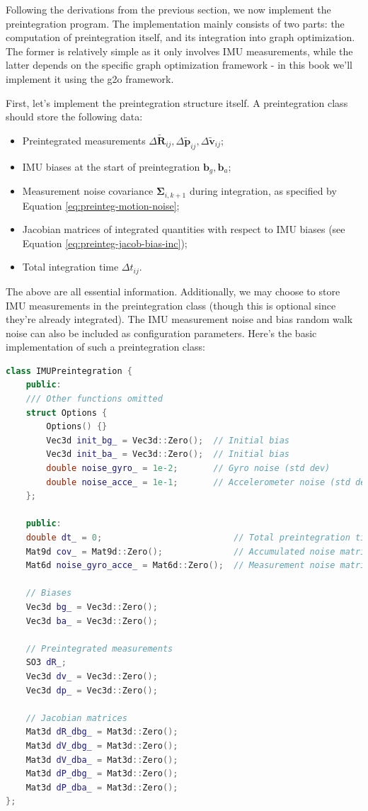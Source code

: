 Following the derivations from the previous section, we now implement the preintegration program. The implementation mainly consists of two parts: the computation of preintegration itself, and its integration into graph optimization. The former is relatively simple as it only involves IMU measurements, while the latter depends on the specific graph optimization framework - in this book we'll implement it using the g2o framework.

First, let's implement the preintegration structure itself. A preintegration class should store the following data:
\begin{itemize}
	\item Preintegrated measurements $\Delta \tilde{\mathbf{R}}_{ij}, \Delta \tilde{\mathbf{p}}_{ij}, \Delta \tilde{\mathbf{v}}_{ij}$;
	\item IMU biases at the start of preintegration $\mathbf{b}_g, \mathbf{b}_a$;
	\item Measurement noise covariance $\boldsymbol{\Sigma}_{i,k+1}$ during integration, as specified by Equation \eqref{eq:preinteg-motion-noise};
	\item Jacobian matrices of integrated quantities with respect to IMU biases (see Equation \eqref{eq:preinteg-jacob-bias-inc});
	\item Total integration time $\Delta t_{ij}$.
\end{itemize}

The above are all essential information. Additionally, we may choose to store IMU measurements in the preintegration class (though this is optional since they're already integrated). The IMU measurement noise and bias random walk noise can also be included as configuration parameters. Here's the basic implementation of such a preintegration class:

\begin{lstlisting}[language=c++, caption=src/ch4/imu\_preintegration.h]
class IMUPreintegration {
	public:
	/// Other functions omitted
	struct Options {
		Options() {}
		Vec3d init_bg_ = Vec3d::Zero();  // Initial bias
		Vec3d init_ba_ = Vec3d::Zero();  // Initial bias
		double noise_gyro_ = 1e-2;       // Gyro noise (std dev)
		double noise_acce_ = 1e-1;       // Accelerometer noise (std dev)
	};
	
	public:
	double dt_ = 0;                          // Total preintegration time
	Mat9d cov_ = Mat9d::Zero();              // Accumulated noise matrix
	Mat6d noise_gyro_acce_ = Mat6d::Zero();  // Measurement noise matrix
	
	// Biases
	Vec3d bg_ = Vec3d::Zero();
	Vec3d ba_ = Vec3d::Zero();
	
	// Preintegrated measurements
	SO3 dR_;
	Vec3d dv_ = Vec3d::Zero();
	Vec3d dp_ = Vec3d::Zero();
	
	// Jacobian matrices
	Mat3d dR_dbg_ = Mat3d::Zero();
	Mat3d dV_dbg_ = Mat3d::Zero();
	Mat3d dV_dba_ = Mat3d::Zero();
	Mat3d dP_dbg_ = Mat3d::Zero();
	Mat3d dP_dba_ = Mat3d::Zero();
};
\end{lstlisting}

